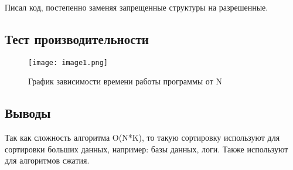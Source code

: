 \documentclass[12pt]{article}
\begin{document}
Писал код, постепенно заменяя запрещенные структуры на разрешенные. 

\subsection*{Тест производительности}

\begin{figure}[H]
    \centering
    \texttt{[image: image1.png]}
    \caption{График зависимости времени работы программы от N}
    \label{fig:graph}
\end{figure}

\subsection*{Выводы}

Так как сложность алгоритма O(N*K), то такую сортировку используют для сортировки больших данных, например: базы данных, логи. Также используют для алгоритмов сжатия.
\end{document}
